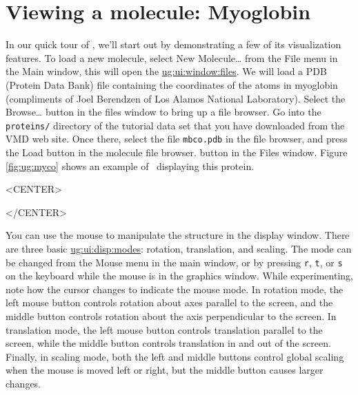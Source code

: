 \section{Viewing a molecule: Myoglobin}
\label{ug:tutorial:viewing}
In our quick tour of \VMD, we'll start out by demonstrating a few
of its visualization features.
To load a new molecule, select {\sf New Molecule\ldots}
from the {\sf File} menu in the Main window, this will open the 
\hyperref{{\sf Files} window}{{\sf Files} window [\S }{]}{ug:ui:window:files}.
We will load a PDB (Protein Data Bank) file containing the coordinates
of the atoms in myoglobin 
(compliments of Joel Berendzen of Los Alamos National Laboratory).  
Select the {\sf Browse\ldots} button in the files window to bring up a file
browser.  Go into the {\tt proteins/} directory of the tutorial data set
that you have downloaded from the VMD web site.
Once there, select the file {\tt mbco.pdb} in the file browser, and
press the {\sf Load} button in the molecule file browser.
button in the Files window.  
Figure \ref{fig:ug:myco} shows an example of \VMD\ displaying this protein.

\begin{rawhtml}
<CENTER>
\end{rawhtml}
\begin{rawhtml}
</CENTER>
\end{rawhtml}

You can use the mouse to manipulate the structure in the display
window.  There are three basic 
\hyperref{mouse modes}{mouse modes [\S }{]}{ug:ui:disp:modes}: 
rotation, translation, and scaling.
The mode can be changed from the Mouse menu in the main window, or by
pressing {\tt r}, {\tt t}, or {\tt s} on the keyboard while the mouse
is in the graphics window.  
While experimenting, note how the cursor changes to indicate the mouse mode.  
In rotation mode, the left mouse button controls
rotation about axes parallel to the screen, and the middle button
controls rotation about the axis perpendicular to the screen.  In
translation mode, the left mouse button controls translation parallel
to the screen, while the middle button controls translation in and
out of the screen.  Finally, in scaling mode, both the left and middle
buttons control global scaling when the mouse is moved left or right,
but the middle button causes larger changes.  

